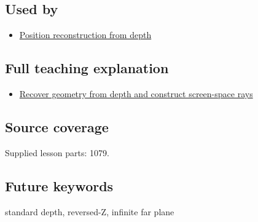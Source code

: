 \subsection{Used by}\label{appendix-1bc40b08db4a-used-by}

\begin{itemize}
\tightlist
\item
  \hyperref[appendix-2cbf2968e866]{Position reconstruction from depth}
\end{itemize}

\subsection{Full teaching explanation}\label{appendix-1bc40b08db4a-full-teaching-explanation}

\begin{itemize}
\tightlist
\item
  \hyperref[02-foundations-ii-ch035-recover-geometry-from-depth-and-construct-screen-space-rays]{Recover geometry from depth and construct screen-space rays}
\end{itemize}

\subsection{Source coverage}\label{appendix-1bc40b08db4a-source-coverage}

Supplied lesson parts: 1079.

\subsection{Future keywords}\label{appendix-1bc40b08db4a-future-keywords}

standard depth, reversed-Z, infinite far plane
